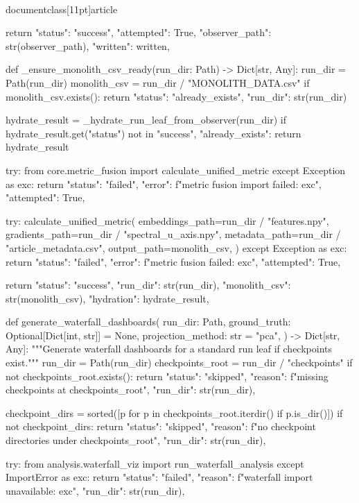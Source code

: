 \\documentclass[11pt]{article}
\begin{document}
\begin{CodeBlock}
    return {
        "status": "success",
        "attempted": True,
        "observer_path": str(observer_path),
        "written": written,
    }


def _ensure_monolith_csv_ready(run_dir: Path) -> Dict[str, Any]:
    run_dir = Path(run_dir)
    monolith_csv = run_dir / "MONOLITH_DATA.csv"
    if monolith_csv.exists():
        return {"status": "already_exists", "run_dir": str(run_dir)}

    hydrate_result = _hydrate_run_leaf_from_observer(run_dir)
    if hydrate_result.get("status") not in {"success", "already_exists"}:
        return hydrate_result

    try:
        from core.metric_fusion import calculate_unified_metric
    except Exception as exc:
        return {
            "status": "failed",
            "error": f"metric fusion import failed: {exc}",
            "attempted": True,
        }

    try:
        calculate_unified_metric(
            embeddings_path=run_dir / "features.npy",
            gradients_path=run_dir / "spectral_u_axis.npy",
            metadata_path=run_dir / "article_metadata.csv",
            output_path=monolith_csv,
        )
    except Exception as exc:
        return {
            "status": "failed",
            "error": f"metric fusion failed: {exc}",
            "attempted": True,
        }

    return {
        "status": "success",
        "run_dir": str(run_dir),
        "monolith_csv": str(monolith_csv),
        "hydration": hydrate_result,
    }


def generate_waterfall_dashboards(
    run_dir: Path,
    ground_truth: Optional[Dict[int, str]] = None,
    projection_method: str = "pca",
) -> Dict[str, Any]:
    """Generate waterfall dashboards for a standard run leaf if checkpoints exist."""
    run_dir = Path(run_dir)
    checkpoints_root = run_dir / "checkpoints"
    if not checkpoints_root.exists():
        return {
            "status": "skipped",
            "reason": f"missing checkpoints at {checkpoints_root}",
            "run_dir": str(run_dir),
        }

    checkpoint_dirs = sorted([p for p in checkpoints_root.iterdir() if p.is_dir()])
    if not checkpoint_dirs:
        return {
            "status": "skipped",
            "reason": f"no checkpoint directories under {checkpoints_root}",
            "run_dir": str(run_dir),
        }

    try:
        from analysis.waterfall_viz import run_waterfall_analysis
    except ImportError as exc:
        return {
            "status": "failed",
            "reason": f"waterfall import unavailable: {exc}",
            "run_dir": str(run_dir),
        }


\end{CodeBlock}
\end{document}
